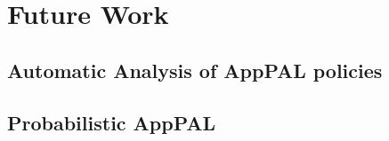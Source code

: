 \documentclass[thesis.tex]{subfiles}
\begin{document}
\chapter{Future Work}

\section{Automatic Analysis of AppPAL policies}

\section{Probabilistic AppPAL}
\end{document}
